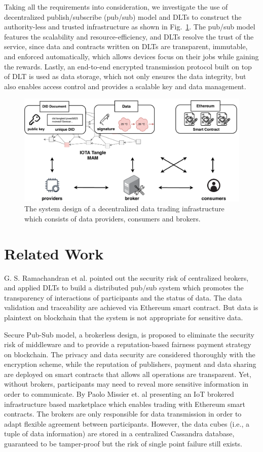\documentclass[conference]{IEEEtran}
\begin{document}
Taking all the requirements into consideration, we investigate the use of decentralized publish/subscribe (pub/sub) model and DLTs to construct the authority-less and trusted infrastructure as shown in Fig.~\ref{fig:system_design}. The pub/sub model features the scalability and resource-efficiency, and DLTs resolve the trust of the service, since data and contracts written on DLTs are transparent, immutable, and enforced automatically, which allows devices focus on their jobs while gaining the rewards. Lastly, an end-to-end encrypted transmission protocol built on top of DLT is used as data storage, which not only ensures the data integrity, but also enables access control and provides a scalable key and data management.

\begin{figure}[!t]
    \centering
    \includegraphics[width=3.in]{system_design}
    \caption{The system design of a decentralized data trading infrastructure which consists of data providers, consumers and brokers.}
    \label{fig:system_design}
\end{figure}

\section{Related Work}
\label{section:relatedWork}
G. S. Ramachandran et al.\cite{trinity} pointed out the security risk of centralized brokers, and applied DLTs to build a distributed pub/sub system which promotes the transparency of interactions of participants and the status of data. The data validation and traceability are achieved via Ethereum smart contract. But data is plaintext on blockchain that the system is not appropriate for sensitive data.

Secure Pub-Sub model\cite{SPS}, a brokerless design, is proposed to eliminate the security risk of middleware and to provide a reputation-based fairness payment strategy on blockchain.
The privacy and data security are considered thoroughly with the encryption scheme, while the reputation of publishers, payment and data sharing are deployed on smart contracts that allows all operations are transparent. Yet, without brokers, participants may need to reveal more sensitive information in order to communicate. By Paolo Missier et. al\cite{MindMyValue} presenting an IoT brokered infrastructure based marketplace which enables trading with Ethereum smart contracts. The brokers are only responsible for data transmission in order to adapt flexible agreement between participants. However, the data cubes (i.e., a tuple of data information) are stored in a centralized Cassandra database, guaranteed to be tamper-proof but the risk of single point failure still exists.
\end{document}
